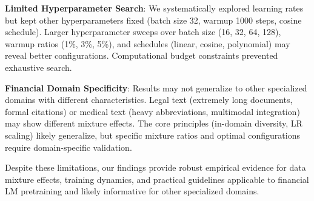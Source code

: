 \textbf{Limited Hyperparameter Search}: We systematically explored learning rates but kept other hyperparameters fixed (batch size 32, warmup 1000 steps, cosine schedule). Larger hyperparameter sweeps over batch size (16, 32, 64, 128), warmup ratios (1\%, 3\%, 5\%), and schedules (linear, cosine, polynomial) may reveal better configurations. Computational budget constraints prevented exhaustive search.

\textbf{Financial Domain Specificity}: Results may not generalize to other specialized domains with different characteristics. Legal text (extremely long documents, formal citations) or medical text (heavy abbreviations, multimodal integration) may show different mixture effects. The core principles (in-domain diversity, LR scaling) likely generalize, but specific mixture ratios and optimal configurations require domain-specific validation.

Despite these limitations, our findings provide robust empirical evidence for data mixture effects, training dynamics, and practical guidelines applicable to financial LM pretraining and likely informative for other specialized domains.